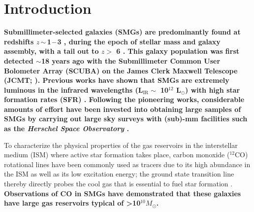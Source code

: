 \documentclass[iop, revtex4]{emulateapj}
\newcommand{\Msun}{\mbox{$M_{\odot}$}}
\newcommand{\Lsun}{\mbox{L$_{\odot}$}}
\newcommand{\eg}{{\sl e.g.,~}}
\newcommand{\pmOne}{\mbox{$^{-1}$}}
\begin{document}
\section{Introduction}\label{sec:intro}
{\bf Submillimeter-selected galaxies (SMGs) are predominantly found at redshifts $z$\,$\sim$\,1\,--\,3 \citep{Chapman05a}, during the epoch of stellar mass and
galaxy assembly, with a tail out to $z>$ 6 \citep{Riechers13a}. This galaxy population was first detected 
$\sim$18 years ago with the Submillimeter Common User Bolometer Array (SCUBA) on the James
Clerk Maxwell Telescope (JCMT; \citealt{Smail97a, Hughes98a, Barger98a}). 
Previous works %
have shown that SMGs
 are extremely luminous in the infrared
 wavelengths (L$_\textrm{IR} \sim$ 10$^{12}$ \Lsun) with high star formation rates (SFR) \citep[$\gtrsim $ 500 \Msun yr\pmOne; see \eg reviews by][]{Lagache05a,Casey14a}.  Following the pioneering works, considerable amounts of effort have been invested into 
obtaining large samples of SMGs by carrying out
  large sky surveys with (sub)-mm facilities such as the {\it Herschel Space Observatory} \citep[\eg H-ATLAS, SPT, HerMES; ][]{Eales10a,Carlstrom11a,Oliver12a}.  
  }
  
  To characterize the physical properties of the gas reservoirs in the interstellar medium (ISM) where active star formation takes place, carbon monoxide ($^{12}$CO) rotational lines have been commonly used as tracers due to its high abundance in the ISM as well as its low excitation energy; the ground state transition line thereby directly probes the cool gas that is essential to fuel star formation \citep[see \eg reviews by][]{Solomon05a,Carilli13a}.{ \bf Observations of CO in SMGs 
  have demonstrated that these galaxies have large gas reservoirs typical of \textgreater 10$^{10}$\Msun \citep[\eg][]{Frayer98a, Riechers11c, Neri03a, Riechers11d,Ivison11a,Bothwell13a}.}
\end{document}
